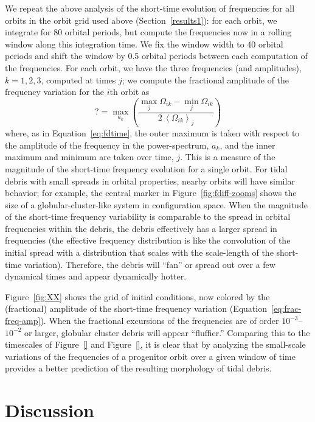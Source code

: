 \documentclass[letterpaper,12pt,preprint]{aastex}
\newcommand{\mean}[1]{\left< #1 \right>}
\begin{document}
We repeat the above analysis of the short-time evolution of frequencies for all orbits in the orbit grid used above (Section~\ref{results1}): for each orbit, we integrate for 80 orbital periods, but compute the frequencies now in a rolling window along this integration time. We fix the window width to 40 orbital periods and shift the window by 0.5 orbital periods between each computation of the frequencies. For each orbit, we have the three frequencies (and amplitudes), $k=1,2,3$, computed at times $j$; we compute the fractional amplitude of the frequency variation for the $i$th orbit as
\begin{equation}
	? = \max_{a_k} \left(\frac{\max_j \Omega_{ik} - \min_j \Omega_{ik}}{2 \, \mean{\Omega_{ik}}_j}\right) \label{eq:frac-freq-amp}
\end{equation}
where, as in Equation~\ref{eq:fdtime}, the outer maximum is taken with respect to the amplitude of the frequency in the power-spectrum, $a_k$, and the inner maximum and minimum are taken over time, $j$. This is a measure of the magnitude of the short-time frequency evolution for a single orbit. For tidal debris with small spreads in orbital properties, nearby orbits will have similar behavior; for example, the central marker in Figure~\ref{fig:fdiff-zooms} shows the size of a globular-cluster-like system in configuration space. When the magnitude of the short-time frequency variability is comparable to the spread in orbital frequencies within the debris, the debris effectively has a larger spread in frequencies (the effective frequency distribution is like the convolution of the initial spread with a distribution that scales with the scale-length of the short-time variation). Therefore, the debris will ``fan'' or spread out over a few dynamical times and appear dynamically hotter.

Figure~\ref{fig:XX} shows the grid of initial conditions, now colored by the (fractional) amplitude of the short-time frequency variation (Equation~\ref{eq:frac-freq-amp}). When the fractional excursions of the frequencies are of order $10^{-3}$--$10^{-2}$ or larger, globular cluster debris will appear ``fluffier.'' Comparing this to the timescales of Figure~\ref{} and Figure~\ref{}, it is clear that by analyzing the small-scale variations of the frequencies of a progenitor orbit over a given window of time provides a better prediction of the resulting morphology of tidal debris. 

\section{Discussion}\label{sec:discussion}
\end{document}
